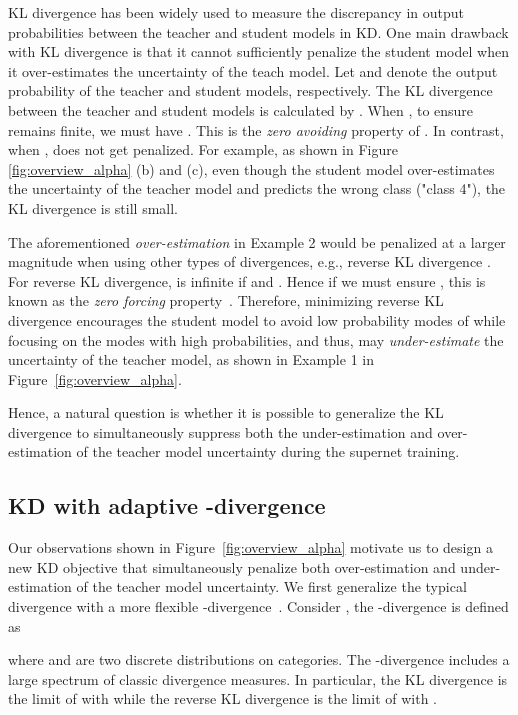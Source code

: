 \documentclass{article}
\begin{document}
KL divergence has been widely used to measure the discrepancy in output probabilities between the teacher and student models in KD. 
One main drawback with KL divergence is that it cannot sufficiently penalize the student model when it over-estimates the uncertainty of the teach model.
Let  and  denote the output probability of the teacher and student models, respectively. The KL divergence between the teacher and student models is calculated by . When , to ensure  remains finite, we must have . This is the \emph{zero avoiding} property of . In contrast, when ,  does not get penalized. 
For example, as shown in Figure \ref{fig:overview_alpha} (b) and (c), even though the student model over-estimates the uncertainty of the teacher model and predicts the wrong class ("class 4"), the KL divergence is still small.


The aforementioned \emph{over-estimation} in Example 2 would be penalized
at a larger magnitude when using other types of divergences, e.g., reverse KL divergence . 
For reverse KL divergence, 
 is infinite if  and . 
Hence if  we must ensure , this is known as the \emph{zero forcing} property~\citep{murphy2012machine}. 
Therefore, minimizing reverse KL divergence encourages the student model  to avoid low probability modes of  while focusing on the modes with high probabilities, and thus, may \emph{under-estimate} the uncertainty of the teacher model, as shown in Example 1 in Figure~\ref{fig:overview_alpha}. 

Hence, a natural question is whether it is possible to generalize the KL divergence to simultaneously suppress both the under-estimation and over-estimation of the teacher model uncertainty during the supernet training.

\subsection{KD with adaptive -divergence}
Our observations shown in Figure~\ref{fig:overview_alpha} motivate us to design a new KD objective that 
simultaneously penalize both over-estimation and under-estimation of the teacher model uncertainty. 
We first generalize the typical  divergence with a more flexible -divergence~\citep{minka2005divergence}. Consider , 
the -divergence is defined as 

where  and  are two discrete distributions on  categories. 
The -divergence includes a large spectrum of classic divergence measures. In particular, 
 the KL divergence    is the limit of  with  while the reverse KL divergence  is the limit of  with .
\end{document}
